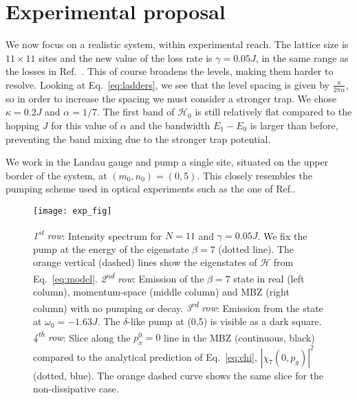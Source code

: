 \documentclass[twocolumn, 10pt, aps, superscriptaddress, floatfix, showpacs, pra, citeautoscript]{revtex4-1}
\newcommand{\ts}{\textsuperscript}
\newcommand{\co}[2]{#2}
\renewcommand{\paragraph}{\co}
\begin{document}
\section{Experimental proposal}
\label{sec:experiment}

\paragraph{Greater dissipation implies spectral broadening.}
We now focus on a realistic system, within experimental reach. The
lattice size is $11 \times 11$ sites and the new value of the loss
rate is $\gamma = 0.05 J$, in the same range as the losses in
Ref.~. This of course broadens the
levels, making them harder to resolve. Looking at
Eq.~\eqref{eq:ladders}, we see that the level spacing is given by
$\frac{\kappa}{2\pi\alpha}$, so in order to increase the spacing we
must consider a stronger trap. We chose $\kappa = 0.2 J$ and
$\alpha = 1/7$. The first band of $\mathcal{H}_0$ is still relatively
flat compared to the hopping $J$ for this value of $\alpha$ and the
bandwidth $E_1 - E_0$ is larger than before, preventing the band
mixing due to the stronger trap potential.

We work in the Landau gauge and pump a single site, situated on the
upper border of the system, at $(m_0,n_0)= (0,5)$. This closely
resembles the pumping scheme used in optical experiments such as the
one of Ref.\cite{hafezi2013imaging}. 

\begin{figure}[htb]
  \centering
  \texttt{[image: exp\_fig]} %
  \caption{\emph{1\ts{st} row}: Intensity spectrum for $N=11$ and
    $\gamma = 0.05 J$. We fix the pump at the energy of the eigenstate
    $\beta=7$ (dotted line). The orange vertical (dashed) lines
    show the eigenstates of $\mathcal{H}$ from Eq.~\eqref{eq:model}.
  \emph{2\ts{nd} row}: Emission of the $\beta=7$ state in real
    (left column), momentum-space (middle column) and MBZ (right
    column) with no pumping or decay.
    \emph{3\ts{rd} row}: Emission from the state at $\omega_0 = -1.63 J$.
    The $\delta$-like pump at (0,5) is visible as a dark square.
    \emph{4\ts{th} row}: Slice along the $p_x^0 = 0$ line in the MBZ
    (continuous, black) compared to the analytical prediction of
    Eq.~\eqref{eq:chi}, $|\chi_7(0,p_y)|^2$ (dotted, blue). The orange
    dashed curve shows the same slice for the non-dissipative case.}
  \label{fig:exp}
\end{figure}
\end{document}
